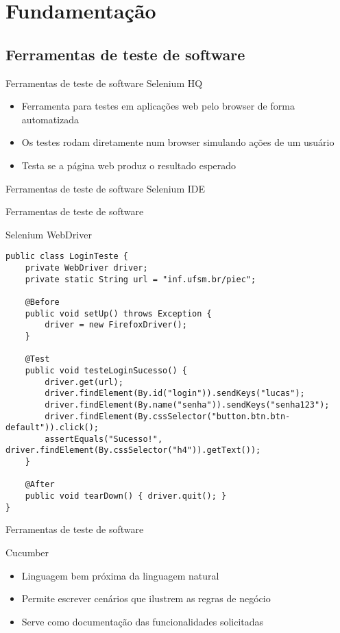 \documentclass{beamer}
\begin{document}
\section{Fundamentação}
\subsection{Ferramentas de teste de software}
\begin{frame}{Ferramentas de teste de software}
    Selenium HQ
	\begin{itemize}
		\item Ferramenta para testes em aplicações web pelo browser de forma automatizada
        \item Os testes rodam diretamente num browser simulando ações de um usuário
        \item Testa se a página web produz o resultado esperado
	\end{itemize}
\end{frame}
\begin{frame}{Ferramentas de teste de software}
    Selenium IDE
    \begin{center}\end{center}
\end{frame}
\begin{frame}[fragile]{Ferramentas de teste de software}
    \item Selenium WebDriver
    \begin{lstlisting}
public class LoginTeste {
    private WebDriver driver;
    private static String url = "inf.ufsm.br/piec";

    @Before
    public void setUp() throws Exception {
        driver = new FirefoxDriver();
    }

    @Test
    public void testeLoginSucesso() {
        driver.get(url);
        driver.findElement(By.id("login")).sendKeys("lucas");
        driver.findElement(By.name("senha")).sendKeys("senha123");
        driver.findElement(By.cssSelector("button.btn.btn-default")).click();
        assertEquals("Sucesso!", driver.findElement(By.cssSelector("h4")).getText());
    }

    @After
    public void tearDown() { driver.quit(); }
}
	\end{lstlisting}
\end{frame}
\begin{frame}[fragile]{Ferramentas de teste de software}
    \item Cucumber
	\begin{itemize}
		\item Linguagem bem próxima da linguagem natural
		\item Permite escrever cenários que ilustrem as regras de negócio
        \item Serve como documentação das funcionalidades solicitadas
	\end{itemize}
\end{frame}
\end{document}
